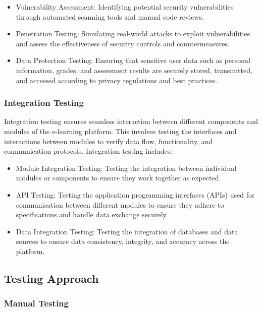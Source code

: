 		\begin{itemize}
			\item Vulnerability Assessment: Identifying potential security vulnerabilities through automated scanning tools and manual code reviews.
			\item Penetration Testing: Simulating real-world attacks to exploit vulnerabilities and assess the effectiveness of security controls and countermeasures.
			\item Data Protection Testing: Ensuring that sensitive user data such as personal information, grades, and assessment results are securely stored, transmitted, and accessed according to privacy regulations and best practices.
		\end{itemize}
		
		\subsubsection{Integration Testing}
		
		Integration testing ensures seamless interaction between different components and modules of the e-learning platform. This involves testing the interfaces and interactions between modules to verify data flow, functionality, and communication protocols. Integration testing includes:
		
		\begin{itemize}
			\item Module Integration Testing: Testing the integration between individual modules or components to ensure they work together as expected.
			\item API Testing: Testing the application programming interfaces (APIs) used for communication between different modules to ensure they adhere to specifications and handle data exchange securely.
			\item Data Integration Testing: Testing the integration of databases and data sources to ensure data consistency, integrity, and accuracy across the platform.
		\end{itemize}
		
	\subsection{Testing Approach}
		
		\subsubsection{Manual Testing}
		
